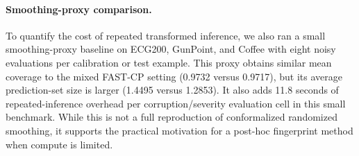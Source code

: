 \paragraph{Smoothing-proxy comparison.}
To quantify the cost of repeated transformed inference, we also ran a small smoothing-proxy baseline on ECG200, GunPoint, and Coffee with eight noisy evaluations per calibration or test example. This proxy obtains similar mean coverage to the mixed FAST-CP setting (0.9732 versus 0.9717), but its average prediction-set size is larger (1.4495 versus 1.2853). It also adds 11.8 seconds of repeated-inference overhead per corruption/severity evaluation cell in this small benchmark. While this is not a full reproduction of conformalized randomized smoothing, it supports the practical motivation for a post-hoc fingerprint method when compute is limited.
